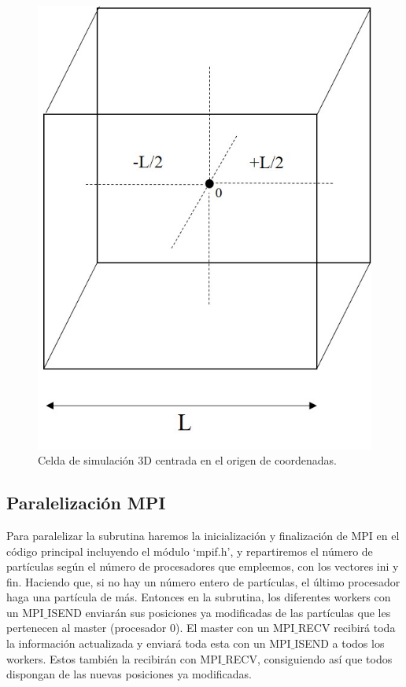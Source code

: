 \documentclass[onecolumn]{article}
\begin{document}
 \begin{figure}[h!]
	\includegraphics[scale=0.32]{imagen_min_3d.jpg}
	\caption{Celda de simulación 3D centrada en el origen de coordenadas.}
	\label{fig:min3d}
\end{figure}

\subsection{Paralelización MPI}

Para paralelizar la subrutina haremos la inicialización y finalización de MPI en el código principal incluyendo el módulo `mpif.h', y repartiremos el número de partículas según el número de procesadores que empleemos, con los vectores ini y fin. Haciendo que, si no hay un número entero de partículas, el último procesador haga una partícula de más. 
Entonces en la subrutina, los diferentes workers con un MPI$\_$ISEND enviarán sus posiciones ya modificadas de las partículas que les pertenecen al master (procesador 0). El master con un MPI$\_$RECV recibirá toda la información actualizada y enviará toda esta con un MPI$\_$ISEND a todos los workers. Estos también la recibirán con MPI$\_$RECV, consiguiendo así que todos dispongan de las nuevas posiciones ya modificadas.
\end{document}
